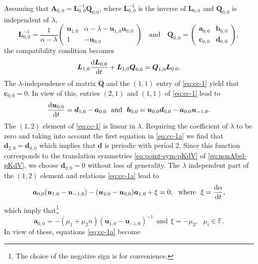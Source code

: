 \documentclass[dvips,10pt]{article}
\newcommand{\bs}{\boldsymbol}
\newcommand{\bsu}{ {\bs{u}}}
\theoremstyle{remark} %
\begin{document}
	Assuming that ${\bs{A}}_{0,0}  = {\bs{L}}^{-1}_{0,0} {\bs{Q}}_{0,0}$, where ${\bs{L}}^{-1}_{0,0}$ is  the inverse of ${\bs{L}}_{0,0}$ and ${\bs{Q}}_{0,0}$ is independent of $\lambda$, 
	$${\bs{L}}^{-1}_{0,0} = \frac{1}{ \alpha-\lambda} \begin{pmatrix}
		\bsu_{1,0} &  \alpha -\lambda - \bsu_{1,0} \bsu_{0,0} \\ 1 & -\bsu_{0,0}
	\end{pmatrix} \quad {\mbox{and}} \quad {\bs{Q}}_{0,0} = \begin{pmatrix}
		{\bs{a}}_{0,0} & {\bs{b}}_{0,0} \\ {\bs{c}}_{0,0} & {\bs{d}}_{0,0} \end{pmatrix}, $$
	the compatibility condition becomes
	\begin{equation} \label{eq:cc-1}
		{\bs{L}}_{1,0} \frac{{\rm{d}} {\bs{L}}_{0,0}}{{\rm{d}} t} +  {\bs{L}}_{1,0} {\bs{Q}}_{0,0} = {\bs{Q}}_{1,0} {\bs{L}}_{0,0}.
	\end{equation}
	The $\lambda$-independence of matrix $\bs{Q}$ and the $(1,1)$ entry of \eqref{eq:cc-1} yield that ${\bs{c}}_{0,0}=0$. In view of this, entries $(2,1)$ and $(1,1)$ of \eqref{eq:cc-1} lead to 
	\begin{equation} \label{eq:cc-1a}
		\frac{{\rm{d}} {\bs{u}}_{0,0}}{{\rm{d}} t} = {\bs{d}}_{1,0} - {\bs{a}}_{0,0} ~~{\text{and}} ~~ {\bs{b}}_{0,0} = \bsu_{0,0} {\bs{d}}_{0,0} - {\bs{a}}_{0,0} \bsu_{-1,0}.
	\end{equation}
	The $(1,2)$ element of \eqref{eq:cc-1} is linear in $\lambda$. Requiring the coefficient of $\lambda$ to be zero and taking into account the first equation in \eqref{eq:cc-1a} we find that ${\bs{d}}_{2,0} = {\bs{d}}_{0,0}$ which implies that ${\bs{d}}$ is periodic with period 2. Since this function corresponds to the translation symmetries \eqref{eq:point-sym-pKdV} of \eqref{eq:nonAbel-pKdV}, we choose ${\bs{d}}_{0,0} =0$ without loss of generality. The $\lambda$ independent part of the $(1,2)$ element and relations \eqref{eq:cc-1a} lead to
	$$ {\bs{a}}_{0,0} (\bsu_{1,0} - \bsu_{-1,0}) - (\bsu_{2,0}-\bsu_{0,0}) {\bs{a}}_{1,0} + \xi = 0, ~~\text{where } ~ \xi = \frac{{\rm{d}} \alpha}{{\rm{d}} t}, $$
	which imply that\footnote{The choice of the negative sign is for convenience.} 
	\begin{equation}
		{\bs{a}}_{0,0} = -(\mu_1 + \mu_2 n)  (\bsu_{1,0} - \bsu_{-1,0})^{-1} ~~ {\text{and}} ~~ \xi =  -\mu_2, ~~~ \mu_i \in {\mathbb{F}}. 
	\end{equation} 
	In view of these, equations \eqref{eq:cc-1a} become
\end{document}
